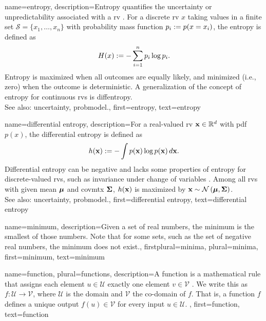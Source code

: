 {name={entropy},
	description={Entropy quantifies the \gls{uncertainty} or unpredictability associated with a \gls{rv} \cite{coverthomas}. 
		  For a discrete \gls{rv} $x$ taking values in a finite set $\mathcal{S} = \{x_1, \ldots, x_n\}$ with 
		probability mass function $p_i := p({x = x_i})$, the entropy is defined as
		\[
		H(x) := -\sum_{i=1}^n p_i \log p_i.
		\]
		Entropy is maximized when all outcomes are equally likely, and minimized (i.e., zero) 
		when the outcome is deterministic. A generalization of the concept of entropy for continuous 
		\glspl{rv} is \gls{diffentropy}. 
\\
		See also: \gls{uncertainty}, \gls{probmodel}.},
	first={entropy},
	text={entropy}
}

{name={differential entropy},
	description={For a real-valued \gls{rv} ${\bf x} \in \mathbb{R}^{d}$ 
		with \gls{pdf} $p(x)$,
		the differential entropy is defined as \cite{coverthomas}
		\[
		h({\bf x}) := - \int p({\bf x}) \log p({\bf x}) \, d{\bf x}.
		\]
		Differential entropy can be negative and lacks some properties of \gls{entropy} for 
		discrete-valued \glspl{rv}, such as invariance under change of variables \cite{coverthomas}. 
		Among all \glspl{rv} with given \gls{mean} ${\bm \mu}$ and \gls{covmtx} ${\bf \Sigma}$, 
		$h({\bf x})$ is maximized by ${\bf x} \sim \mathcal{N}\left({\bm \mu},{\bf \Sigma}\right)$. 
		\\
		See also: \gls{uncertainty}, \gls{probmodel}.},
	first={differential entropy},
	text={differential entropy}
}


{name=minimum,
	description={Given a set of real numbers, the minimum is the smallest of those numbers.
	Note that for some sets, such as the set of negative real numbers, the minimum does not exist.},
	firstplural={minima}, 
 	plural={minima},
	first={minimum},
	text={minimum}
}

{name={function}, plural={functions}, 
	description={A function is a mathematical rule that assigns each 
		  element $u \in \mathcal{U}$ exactly one element $v \in \mathcal{V}$ \cite{RudinBookPrinciplesMatheAnalysis}. 
		  We write this as $f: \mathcal{U} \rightarrow \mathcal{V}$, where $\mathcal{U}$ is the domain 
		  and $\mathcal{V}$ the co-domain of $f$. That is, a function $f$ defines a unique 
		  output $f(u) \in \mathcal{V}$ for every input $u \in \mathcal{U}$. 
	},
	first={function},
	text={function}
}


